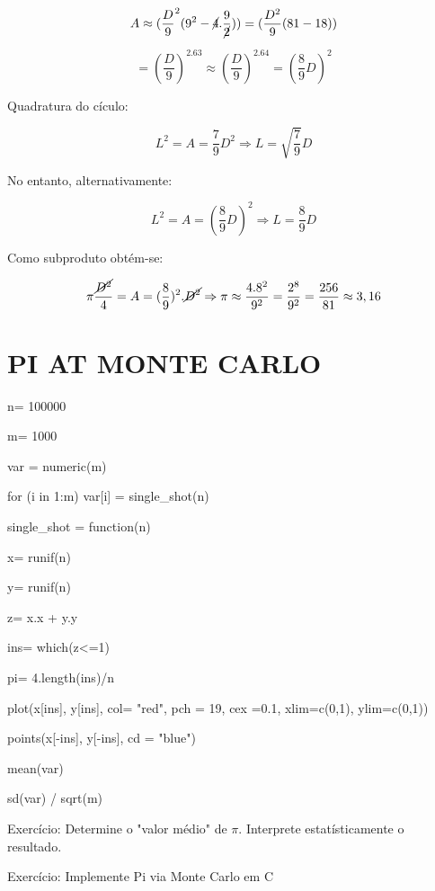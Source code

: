 \documentclass[a4paper, 12pt]{article}
\begin{document}
\[A \approx (\frac{D}{9}^2 (9^2-\cancel{4}.\frac{9}{\cancel{2}})) = (\frac{D^2}{9} (81-18))\]

\[= (\frac{D}{9})^2.63 \approx (\frac{D}{9})^2.64=(\frac{8}{9}D)^2\]

Quadratura do cículo:

\[L^2 = A = \frac{7}{9}D^2 \Rightarrow L = \sqrt{\frac{7}{9}}D\]

No entanto, alternativamente: 

\[L^2 = A = (\frac{8}{9}D)^2 \Rightarrow L=\frac{8}{9}D\]

Como subproduto obtém-se:

\[\pi \frac{\cancel{D^2}}{4} = A = (\frac{8}{9})^2.\cancel{D^2} \Rightarrow \pi \approx \frac{4.8^2}{9^2} = \frac{2^8}{9^2} = \frac{256}{81} \approx 3,16\]

\newpage

\section{PI AT MONTE CARLO}

n= 100000
\newline

m= 1000

var = numeric(m)

for (i in 1:m) var[i] = single\_shot(n)

single\_shot = function(n)
\newline

x= runif(n)

y= runif(n)

z= x.x + y.y

ins= which(z<=1)

pi= 4.length(ins)/n
\newline

plot(x[ins], y[ins], col= "red", pch = 19, cex =0.1, xlim=c(0,1), ylim=c(0,1))

points(x[-ins], y[-ins], cd = "blue")
\newline

mean(var)

sd(var) / sqrt(m)
\newline

Exercício: Determine o "valor médio" de $\pi$. Interprete estatísticamente o resultado.
\newline

Exercício: Implemente Pi via Monte Carlo em C
\newline
\end{document}
